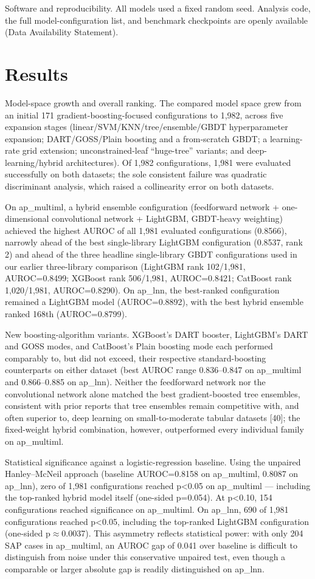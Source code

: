 \documentclass[twoside,11pt]{article}
\begin{document}
Software and reproducibility. All models used a fixed random seed. Analysis code, the full model-configuration list, and benchmark checkpoints are openly available (Data Availability Statement).

\section{Results}

Model-space growth and overall ranking. The compared model space grew from an initial 171 gradient-boosting-focused configurations to 1,982, across five expansion stages (linear/SVM/KNN/tree/ensemble/GBDT hyperparameter expansion; DART/GOSS/Plain boosting and a from-scratch GBDT; a learning-rate grid extension; unconstrained-leaf ``huge-tree'' variants; and deep-learning/hybrid architectures). Of 1,982 configurations, 1,981 were evaluated successfully on both datasets; the sole consistent failure was quadratic discriminant analysis, which raised a collinearity error on both datasets.

On ap\_multiml, a hybrid ensemble configuration (feedforward network + one-dimensional convolutional network + LightGBM, GBDT-heavy weighting) achieved the highest AUROC of all 1,981 evaluated configurations (0.8566), narrowly ahead of the best single-library LightGBM configuration (0.8537, rank 2) and ahead of the three headline single-library GBDT configurations used in our earlier three-library comparison (LightGBM rank 102/1,981, AUROC=0.8499; XGBoost rank 506/1,981, AUROC=0.8421; CatBoost rank 1,020/1,981, AUROC=0.8290). On ap\_lnn, the best-ranked configuration remained a LightGBM model (AUROC=0.8892), with the best hybrid ensemble ranked 168th (AUROC=0.8799).

New boosting-algorithm variants. XGBoost's DART booster, LightGBM's DART and GOSS modes, and CatBoost's Plain boosting mode each performed comparably to, but did not exceed, their respective standard-boosting counterparts on either dataset (best AUROC range 0.836--0.847 on ap\_multiml and 0.866--0.885 on ap\_lnn). Neither the feedforward network nor the convolutional network alone matched the best gradient-boosted tree ensembles, consistent with prior reports that tree ensembles remain competitive with, and often superior to, deep learning on small-to-moderate tabular datasets [40]; the fixed-weight hybrid combination, however, outperformed every individual family on ap\_multiml.

Statistical significance against a logistic-regression baseline. Using the unpaired Hanley--McNeil approach (baseline AUROC=0.8158 on ap\_multiml, 0.8087 on ap\_lnn), zero of 1,981 configurations reached p<0.05 on ap\_multiml --- including the top-ranked hybrid model itself (one-sided p=0.054). At p<0.10, 154 configurations reached significance on ap\_multiml. On ap\_lnn, 690 of 1,981 configurations reached p<0.05, including the top-ranked LightGBM configuration (one-sided p$\approx$0.0037). This asymmetry reflects statistical power: with only 204 SAP cases in ap\_multiml, an AUROC gap of 0.041 over baseline is difficult to distinguish from noise under this conservative unpaired test, even though a comparable or larger absolute gap is readily distinguished on ap\_lnn.
\end{document}

